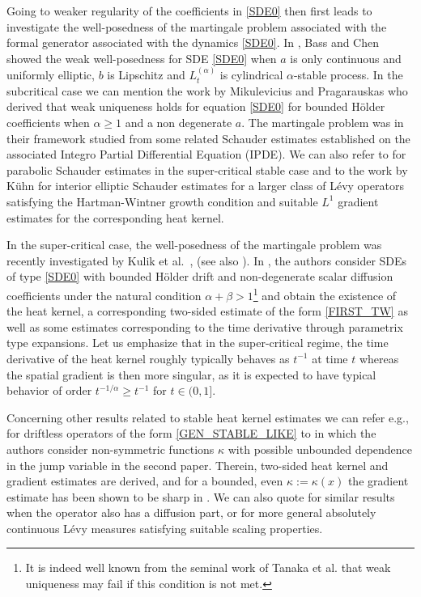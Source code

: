 \documentclass[11pt]{article}
\newcommand{\eg}{e.g.,\xspace}
\numberwithin{equation}{section}\providecommand{\asymp}{\mathrel{\sim}}
\theoremstyle{plain}
\theoremstyle{definition}
\newcommand\1{{\mathbf{1}}}
\begin{document}
Going to weaker regularity of the coefficients in \eqref{SDE0} then first leads to investigate the well-posedness of the martingale problem associated with the formal generator associated with the dynamics \eqref{SDE0}. In \cite{Ba-Ch},
Bass and Chen showed the weak well-posedness for SDE \eqref{SDE0} when $a$ is only continuous and uniformly elliptic,
$b$ is Lipschitz and $L^{(\alpha)}_t$ is cylindrical $\alpha$-stable process.
In the subcritical case we can mention the work by Mikulevicius and Pragarauskas \cite{miku:prag:14}
who derived that weak uniqueness holds for equation \eqref{SDE0} for bounded Hölder coefficients when $ \alpha\ge 1$
and a non degenerate $a$. The martingale problem was in their framework studied from some related Schauder estimates established on the associated Integro Partial Differential Equation (IPDE). We can also refer to \cite{chau:meno:prio:20} for {parabolic} Schauder estimates in the super-critical {stable} case and {to the work by Kühn \cite{kuhn:20} for interior elliptic Schauder estimates for a larger class of Lévy operators satisfying the Hartman-Wintner growth condition and suitable $L^1$ gradient estimates for the corresponding heat kernel}.

In the super-critical case, the well-posedness of the martingale problem was recently investigated by
Kulik et al.\ \cite{knop:kuli:18}, \cite{kuli:19} (see also \cite{CZZ}).
In \cite{kuli:19},
the authors consider SDEs of type \eqref{SDE0} with bounded Hölder drift and non-degenerate scalar diffusion coefficients under the natural condition $\alpha+\beta>1 $\footnote{It is indeed well known from the seminal work of Tanaka et al. \cite{tana:tsuc:wata:74} that weak uniqueness may fail if this condition is not met.} and obtain the existence of the heat kernel,
a corresponding two-sided estimate of the form \eqref{FIRST_TW} as well as some estimates corresponding to the time derivative through parametrix type expansions. Let us emphasize that in the super-critical regime, the time derivative of the heat kernel roughly typically behaves as $t^{-1}$ at time $t$ whereas the spatial gradient is then more singular, as it is expected to have typical behavior of order $t^{-1/\alpha}\ge t^{-1} $ for $t\in (0,1] $.

{Concerning other results related to stable heat kernel estimates we can refer \eg for driftless operators
of the form \eqref{GEN_STABLE_LIKE} to \cite{Ch-Zh}
\cite{Ch-Zh1} in which the authors consider non-symmetric functions $\kappa$ with possible unbounded dependence in the jump variable in the second paper. Therein, two-sided heat kernel and gradient estimates are derived, and for a bounded, even $\kappa:=\kappa(x) $ the gradient estimate has been shown to be sharp in \cite{DZ}. We can also quote \cite{CHXZ} for similar results when the operator also has a diffusion part, or \cite{Ch-Zh20} for more general absolutely continuous Lévy measures satisfying suitable scaling properties.
}
\end{document}
